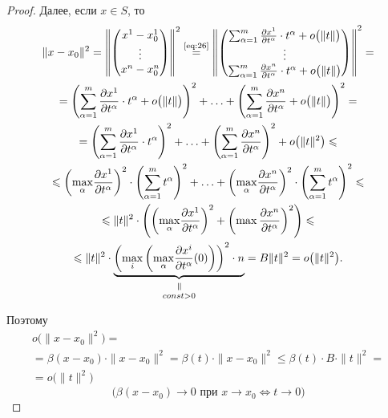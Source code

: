 \begin{proof}
    Далее, если $x\in S$, то
    \begin{multline*}
        \|x-x_0\|^2 = \left\|\left(\begin{matrix}
                x^1 - x_0^1 \\
                \vdots      \\
                x^n - x^n_0
            \end{matrix}\right)\right\|^2 \overset{\text{\ref{eq:26}}}{=} \left\|\left(\begin{matrix}
                \sum_{\alpha=1}^{m}\frac{\partial x^1}{\partial t^\alpha}\cdot t^\alpha + o\big(\|t\|\big) \\
                \vdots                                                                                 \\
                \sum_{\alpha=1}^{m}\frac{\partial x^n}{\partial t^\alpha}\cdot t^\alpha + o\big(\|t\|\big)
            \end{matrix}\right)\right\|^2 = \\
        = \left(\sum_{\alpha = 1}^{m}\frac{\partial x^1}{\partial t^\alpha}\cdot t^\alpha + o\big(\|t\|\big)\right)^2 + \ldots + \left(\sum_{\alpha=1}^{m}\frac{\partial x^n}{\partial t^\alpha} + o\big(\|t\|\big)\right)^2 =\\
        = \left(\sum_{\alpha = 1}^{m}\frac{\partial x^1}{\partial t^\alpha}\cdot t^\alpha \right)^2 + \ldots + \left(\sum_{\alpha=1}^{m}\frac{\partial x^n}{\partial t^\alpha} \right)^2 + o\big(\|t\|^2\big) \leqslant \\
        \leqslant \left( \underset{\alpha}{\max}\frac{\partial x^1}{\partial t^\alpha}\right)^2 \cdot \left(\sum_{\alpha=1}^{m} t^\alpha\right)^2 + \ldots + \left(\underset{\alpha}{\max}\frac{\partial x^n}{\partial t^\alpha}\right)^2\cdot\left(\sum_{\alpha=1}^{m}t^\alpha\right)^2 \leqslant \\
        \leqslant \|t\|^2 \cdot \left(\left(\underset{\alpha}{\max}\frac{\partial x^1}{\partial t^\alpha}\right)^2 + \left(\max \frac{\partial x^n}{\partial t^\alpha}\right)^2\right) \leqslant \\
        \leqslant \|t\|^2 \cdot \equalto{\underbrace{\left(\underset{i}{\max}\left(\underset{\alpha}{\max}\frac{\partial x^i}{\partial t^\alpha}(0)\right)\right)^2 \cdot n}}{const>0} = B\|t\|^2 = o\big(\|t\|^2\big).
    \end{multline*}

    Поэтому
    \begin{multline*}
        o\big(\|x-x_0\|^2\big) = \\
        = \beta(x-x_0)\cdot \|x-x_0\|^2 = \beta(t)\cdot \|x-x_0\|^2 \leqslant \beta(t) \cdot B \cdot \|t\|^2 = \\
        = o\big(\|t\|^2\big)
    \end{multline*}
    \[
        \big(\beta(x-x_0)\rightarrow0\text{ при }x \rightarrow x_0 \iff t \rightarrow 0\big)
    \]
\end{proof}